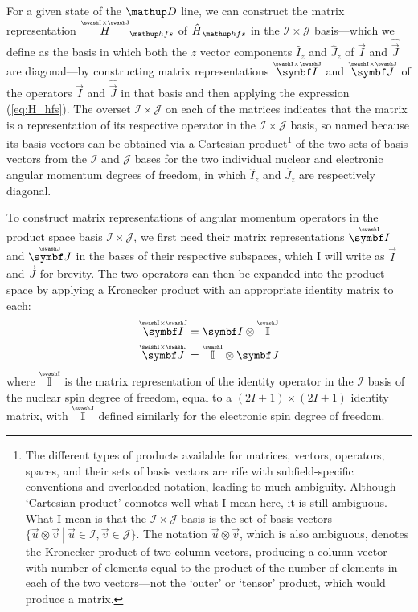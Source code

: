 For a given state of the $\up{D}$ line, we can construct the matrix representation $\oversetIJ H_\up{hfs}$ of $\hat H_\up{hfs}$ in the $\mathcal{I}\times\mathcal{J}$ basis---which we define as the basis in which both the $z$ vector components $\hat{I}_z$ and $\hat{J}_z$ of $\hat{\vec I}$ and $\hat{\vec J}$ are diagonal---by constructing matrix representations $\oversetIJ{\vec I}$ and $\oversetIJ{\vec J}$ of the operators $\hat{\vec I}$ and $\hat{\vec J}$ in that basis and then applying the expression (\ref{eq:H_hfs}). The overset ${\mathcal{I} \times \mathcal{J}}$ on each of the matrices indicates that the matrix is a representation of its respective operator in the ${\mathcal{I} \times \mathcal{J}}$ basis, so named because its basis vectors can be obtained via a Cartesian product\footnote{The different types of products available for matrices, vectors, operators, spaces, and their sets of basis vectors are rife with subfield-specific conventions and overloaded notation, leading to much ambiguity. Although `Cartesian product' connotes well what I mean here, it is still ambiguous. What I mean is that the ${\mathcal{I} \times \mathcal{J}}$ basis is the set of basis vectors $\{\left.\vec u \otimes \vec v\ \right|\ \vec u \in \mathcal{I}, \vec v\in\mathcal{J}\}$. The notation $\vec u \otimes \vec v$, which is also ambiguous, denotes the Kronecker product of two column vectors, producing a column vector with number of elements equal to the product of the number of elements in each of the two vectors---not the `outer' or `tensor' product, which would produce a matrix.} of the two sets of basis vectors from the $\mathcal{I}$ and $\mathcal{J}$ bases for the two individual nuclear and electronic angular momentum degrees of freedom, in which $\hat{I}_z$ and $\hat{J}_z$ are respectively diagonal.

To construct matrix representations of angular momentum operators in the product space basis ${\mathcal{I} \times \mathcal{J}}$, we first need their matrix representations $\oversetI{\vec I}$ and $\oversetJ{\vec J}$ in the bases of their respective subspaces, which I will write as $\vec I$ and $\vec J$ for brevity. The two operators can then be expanded into the product space by applying a Kronecker product with an appropriate identity matrix to each:
\begin{align}\label{eq:kronecker_identity_I}
\oversetIJ{\vec I}
 &= \vec I \otimes \oversetJ{\mathbb{I}}\\
\label{eq:kronecker_identity_J}
\oversetIJ{\vec J}
&= \oversetI{\mathbb{I}} \otimes \vec J
\end{align}
where $\oversetI{\mathbb{I}}$ is the matrix representation of the identity operator in the $\mathcal{I}$ basis of the nuclear spin degree of freedom, equal to a $(2I+1)\times(2I+1)$ identity matrix, with $\oversetJ{\mathbb{I}}$ defined similarly for the electronic spin degree of freedom.

